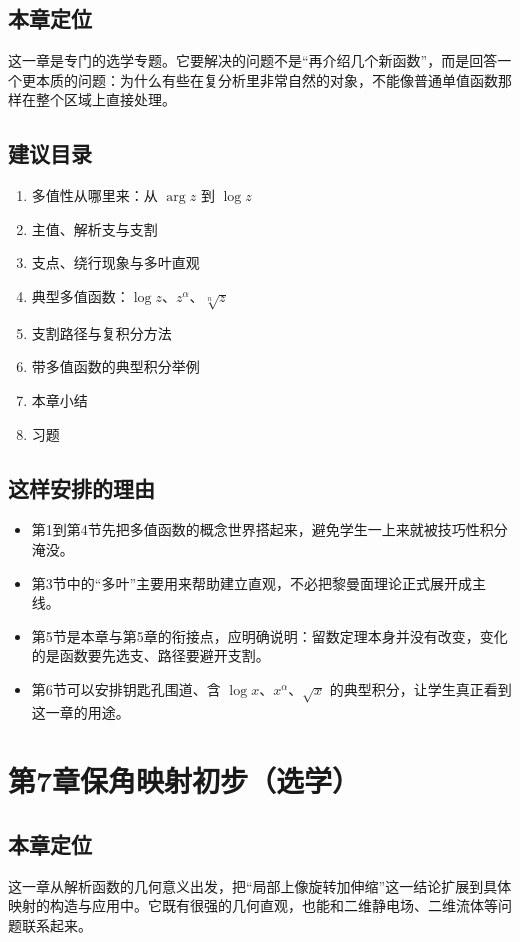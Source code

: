 \subsection*{本章定位}
这一章是专门的选学专题。它要解决的问题不是``再介绍几个新函数''，而是回答一个更本质的问题：为什么有些在复分析里非常自然的对象，不能像普通单值函数那样在整个区域上直接处理。

\subsection*{建议目录}
\begin{enumerate}
    \item 多值性从哪里来：从 $\arg z$ 到 $\log z$
    \item 主值、解析支与支割
    \item 支点、绕行现象与多叶直观
    \item 典型多值函数：$\log z$、$z^\alpha$、$\sqrt[n]{z}$
    \item 支割路径与复积分方法
    \item 带多值函数的典型积分举例
    \item 本章小结
    \item 习题
\end{enumerate}

\subsection*{这样安排的理由}
\begin{itemize}
    \item 第1到第4节先把多值函数的概念世界搭起来，避免学生一上来就被技巧性积分淹没。
    \item 第3节中的``多叶''主要用来帮助建立直观，不必把黎曼面理论正式展开成主线。
    \item 第5节是本章与第5章的衔接点，应明确说明：留数定理本身并没有改变，变化的是函数要先选支、路径要避开支割。
    \item 第6节可以安排钥匙孔围道、含 $\log x$、$x^\alpha$、$\sqrt{x}$ 的典型积分，让学生真正看到这一章的用途。
\end{itemize}

\section*{第7章\quad 保角映射初步（选学）}

\subsection*{本章定位}
这一章从解析函数的几何意义出发，把``局部上像旋转加伸缩''这一结论扩展到具体映射的构造与应用中。它既有很强的几何直观，也能和二维静电场、二维流体等问题联系起来。

